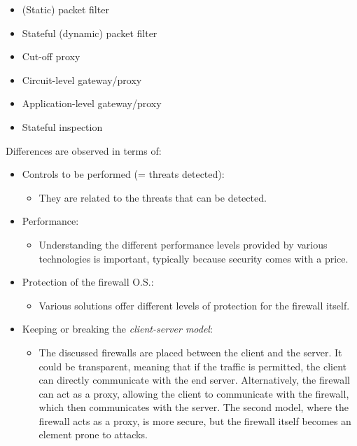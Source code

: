 \begin{itemize}
    \item (Static) packet filter
    \item Stateful (dynamic) packet filter
    \item Cut-off proxy
    \item Circuit-level gateway/proxy
    \item Application-level gateway/proxy
    \item Stateful inspection
\end{itemize}
Differences are observed in terms of:
\begin{itemize}
    \item Controls to be performed (= threats detected):
          \begin{itemize}
              \item They are related to the threats that can be detected.
          \end{itemize}
    \item Performance:
          \begin{itemize}
              \item Understanding the different performance levels provided by various technologies is important, typically because security comes with a price.
          \end{itemize}
    \item Protection of the firewall O.S.:
          \begin{itemize}
              \item Various solutions offer different levels of protection for the firewall itself.
          \end{itemize}
    \item Keeping or breaking the \textit{client-server model}:
          \begin{itemize}
              \item The discussed firewalls are placed between the client and the server. It could be transparent, meaning that if the traffic is permitted, the client can directly communicate with the end server. Alternatively, the firewall can act as a proxy, allowing the client to communicate with the firewall, which then communicates with the server. The second model, where the firewall acts as a proxy, is more secure, but the firewall itself becomes an element prone to attacks.
          \end{itemize}
\end{itemize}


